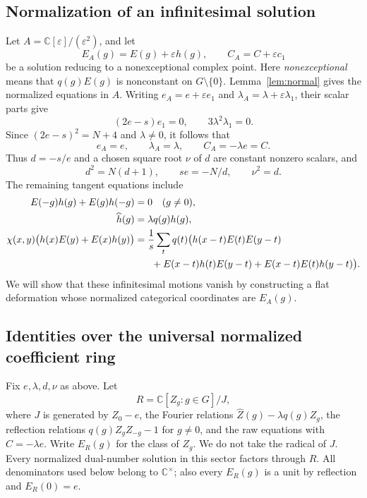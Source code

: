 \documentclass[11pt]{article}
\theoremstyle{remark}
\newcommand{\C}{\mathbb C}
\newcommand{\eps}{\varepsilon}
\begin{document}
\subsection{Normalization of an infinitesimal solution}
Let $A=\C[\eps]/(\eps^2)$, and let
\[
 E_A(g)=E(g)+\eps h(g),\qquad C_A=C+\eps c_1
\]
be a solution reducing to a nonexceptional complex point. Here
\emph{nonexceptional} means that $q(g)E(g)$ is nonconstant on
$G\setminus\{0\}$. Lemma~\ref{lem:normal} gives the normalized equations
in $A$. Writing $e_A=e+\eps e_1$ and
$\lambda_A=\lambda+\eps\lambda_1$, their scalar parts give
\[
 (2e-s)e_1=0,\qquad 3\lambda^2\lambda_1=0.
\]
Since $(2e-s)^2=N+4$ and $\lambda\ne0$, it follows that
\begin{equation}\label{eq:constant-sector}
 e_A=e,\qquad \lambda_A=\lambda,\qquad C_A=-\lambda e=C.
\end{equation}
Thus $d=-s/e$ and a chosen square root $\nu$ of $d$ are constant nonzero
scalars, and
\begin{equation}\label{eq:sector-scalars}
 d^2=N(d+1),\qquad se=-N/d,\qquad \nu^2=d.
\end{equation}
The remaining tangent equations include
\begin{align}
 E(-g)h(g)+E(g)h(-g)&=0 \quad(g\ne0),\label{eq:tangref}\\
 \widehat h(g)&=\lambda q(g)h(g),\label{eq:tangfour}\\
 \chi(x,y)\bigl(h(x)E(y)+E(x)h(y)\bigr)
 &=\frac1s\sum_tq(t)\bigl(h(x-t)E(t)E(y-t)\notag\\
 &\hspace{6mm}+E(x-t)h(t)E(y-t)
              +E(x-t)E(t)h(y-t)\bigr).\label{eq:tangpent}
\end{align}
We will show that these infinitesimal motions vanish by constructing a
flat deformation whose normalized categorical coordinates are $E_A(g)$.

\subsection{Identities over the universal normalized coefficient ring}
Fix $e,\lambda,d,\nu$ as above. Let
\[
 R=\C[Z_g:g\in G]/J,
\]
where $J$ is generated by $Z_0-e$, the Fourier relations
$\widehat Z(g)-\lambda q(g)Z_g$, the reflection relations
$q(g)Z_gZ_{-g}-1$ for $g\ne0$, and the raw equations with
$C=-\lambda e$. Write $E_R(g)$ for the class of $Z_g$.
We do not take the radical of $J$. Every normalized dual-number solution
in this sector factors through $R$. All denominators used below belong
to $\C^\times$; also every $E_R(g)$ is a unit by reflection and $E_R(0)=e$.
\end{document}

